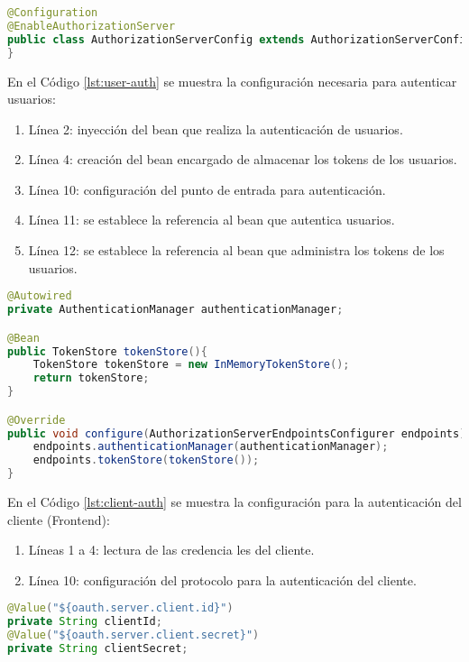 \begin{enumerate}
\begin{lstlisting}[language=Java, caption={Clase de autenticación de usuarios.}, captionpos=b, label={lst:enable-auth-server}]
@Configuration
@EnableAuthorizationServer
public class AuthorizationServerConfig extends AuthorizationServerConfigurerAdapter{
}
\end{lstlisting}

	En el Código \ref{lst:user-auth} se muestra la configuración necesaria para autenticar usuarios:
	\begin{enumerate}
		\item Línea 2: inyección del bean que realiza la autenticación de usuarios.
		\item Línea 4: creación del bean encargado de almacenar los tokens de los usuarios.
		\item Línea 10: configuración del punto de entrada para autenticación.
		\item Línea 11: se establece la referencia al bean que autentica usuarios.
		\item Línea 12: se establece la referencia al bean que administra los tokens de los usuarios.
	\end{enumerate}

\begin{lstlisting}[language=Java, caption={Configuración de autenticación de usuarios.}, captionpos=b, label={lst:user-auth}]
@Autowired
private AuthenticationManager authenticationManager;

@Bean
public TokenStore tokenStore(){
	TokenStore tokenStore = new InMemoryTokenStore();
	return tokenStore;
}

@Override
public void configure(AuthorizationServerEndpointsConfigurer endpoints) throws Exception{
	endpoints.authenticationManager(authenticationManager);
	endpoints.tokenStore(tokenStore());
}
\end{lstlisting}

	En el Código \ref{lst:client-auth} se muestra la configuración para la autenticación del cliente (Frontend):

	\begin{enumerate}
		\item Líneas 1 a 4: lectura de las credencia les del cliente.
		\item Línea 10: configuración del protocolo para la autenticación del cliente. 
	\end{enumerate}

\begin{lstlisting}[language=Java, caption={Clase de autenticación de cliente.}, captionpos=b, label={lst:client-auth}]
@Value("${oauth.server.client.id}")
private String clientId;
@Value("${oauth.server.client.secret}")
private String clientSecret;


\end{lstlisting}
\end{enumerate}
